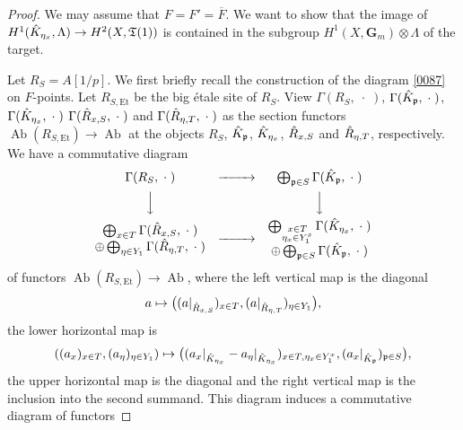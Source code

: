 \documentclass{amsart}
\theoremstyle{remark}
\numberwithin{equation}{section}
\newcommand{\tensor}{\mathbin{\otimes}}
\newcommand{\closure}[1]{\overline{#1}}
\newcommand{\Et}{\mathrm{Et}}
\newcommand{\Gm}{\mathbf{G}_{m}}
\newcommand{\var}{\;\cdot\;}
\newcommand{\ideal}[1]{\mathfrak{#1}}
\DeclareMathOperator{\Ab}{Ab}
\begin{document}
\begin{proof}
	We may assume that $F = F' = \closure{F}$.
	We want to show that
	the image of $H^{1}(\Hat{K}_{\eta_{x}}, \Lambda) \to H^{2}(X, \mathfrak{T}(1))$
	is contained in the subgroup
	$H^{1}(X, \Gm) \tensor \Lambda$ of the target.
	
	Let $R_{S} = A[1 / p]$.
	We first briefly recall the construction of the diagram \eqref{0087} on $F$-points.
	Let $R_{S, \Et}$ be the big \'etale site of $R_{S}$.
	View $\Gamma(R_{S}, \var)$, $\Gamma(\Hat{K}_{\ideal{p}}, \var)$, $\Gamma(\Hat{K}_{\eta_{x}}, \var)$
	$\Gamma(\Hat{R}_{x, S}, \var)$ and $\Gamma(\Hat{R}_{\eta, T}, \var)$ as
	the section functors $\Ab(R_{S, \Et}) \to \Ab$ at the objects
	$R_{S}$, $\Hat{K}_{\ideal{p}}$, $\Hat{K}_{\eta_{x}}$, $\Hat{R}_{x, S}$ and $\Hat{R}_{\eta, T}$,
	respectively.
	We have a commutative diagram
		\[
			\begin{CD}
					\Gamma(R_{S}, \var)
				@>>>
					\bigoplus_{\ideal{p} \in S}
						\Gamma(\Hat{K}_{\ideal{p}}, \var)
				\\ @VVV @VVV \\
					\begin{array}{c}
							\bigoplus_{x \in T}
								\Gamma(\Hat{R}_{x, S}, \var)
						\\
						\oplus
							\bigoplus_{\eta \in Y_{1}}
								\Gamma(\Hat{R}_{\eta, T}, \var)
					\end{array}
				@>>>
					\begin{array}{c}
							\bigoplus_{
								\substack{
									x \in T \\
									\eta_{x} \in Y_{1}^{x}
								}
							}
								\Gamma(\Hat{K}_{\eta_{x}}, \var)
						\\
						\oplus
							\bigoplus_{\ideal{p} \in S}
								\Gamma(\Hat{K}_{\ideal{p}}, \var)
					\end{array}
			\end{CD}
		\]
	of functors $\Ab(R_{S, \Et}) \to \Ab$,
	where the left vertical map is the diagonal
		\[
				a
			\mapsto
				\bigl(
					(a|_{\Hat{R}_{x, S}})_{x \in T},
					(a|_{\Hat{R}_{\eta, T}})_{\eta \in Y_{1}}
				\bigr),
		\]
	the lower horizontal map is
		\[
				((a_{x})_{x \in T}, (a_{\eta})_{\eta \in Y_{1}})
			\mapsto
				\bigl(
					(a_{x}|_{\Hat{K}_{\eta_{x}}} - a_{\eta}|_{\Hat{K}_{\eta_{x}}})_{x \in T, \eta_{x} \in Y_{1}^{x}},
					(a_{x}|_{\Hat{K}_{\ideal{p}}})_{\ideal{p} \in S}
				\bigr),
		\]
	the upper horizontal map is the diagonal
	and the right vertical map is the inclusion into the second summand.
	This diagram induces a commutative diagram of functors

\end{proof}
\end{document}
